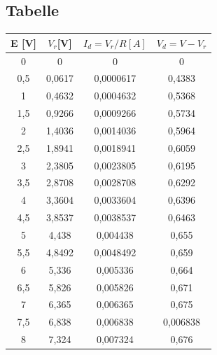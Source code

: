 \documentclass[12pt]{article}
\begin{document}
    \subsection{Tabelle} 
    \begin{table}[H]
        \begin{tabular}{|c|c|c|c|}
            \hline
            \rowcolor{RawSienna!80} E [V] & $V_r$[V] & $I_d=V_r/R [A]$ & $V_d=V-V_r$  \\
            \hline
            \rowcolor{Orange!70} 0 & 0 & 0  & 0 \\
            \hline
            \rowcolor{TealBlue!70} 0,5 & 0,0617 &  0,0000617 &  0,4383 \\
            \hline
            \rowcolor{Orange!70} 1 & 0,4632 &   0,0004632  &  0,5368 \\
            \hline
            \rowcolor{TealBlue!70} 1,5  & 0,9266 &   0,0009266  & 0,5734  \\
            \hline
            \rowcolor{Orange!70} 2 & 1,4036 & 0,0014036  & 0,5964  \\
            \hline
            \rowcolor{TealBlue!70} 2,5  & 1,8941 &  0,0018941   & 0,6059  \\
            \hline
            \rowcolor{Orange!70} 3 & 2,3805 & 0,0023805  & 0,6195  \\
            \hline
            \rowcolor{TealBlue!70} 3,5  & 2,8708 &   0,0028708  & 0,6292  \\
            \hline
            \rowcolor{Orange!70} 4 & 3,3604 & 0,0033604  & 0,6396  \\
            \hline
            \rowcolor{TealBlue!70} 4,5  & 3,8537 &   0,0038537  & 0,6463  \\
            \hline
            \rowcolor{Orange!70} 5 & 4,438 &  0,004438 & 0,655  \\
            \hline
            \rowcolor{TealBlue!70} 5,5  & 4,8492 &  0,0048492   &  0,659 \\
            \hline
            \rowcolor{Orange!70} 6 & 5,336 &  0,005336 &  0,664 \\
            \hline
            \rowcolor{TealBlue!70} 6,5  & 5,826 &  0,005826   & 0,671  \\
            \hline
            \rowcolor{Orange!70} 7 & 6,365 & 0,006365  & 0,675  \\
            \hline
            \rowcolor{TealBlue!70} 7,5  & 6,838 &   0,006838  &  0,006838 \\
            \hline
            \rowcolor{Orange!70} 8 & 7,324 &  0,007324 &  0,676 \\

\end{tabular}
\end{table}
\end{document}
